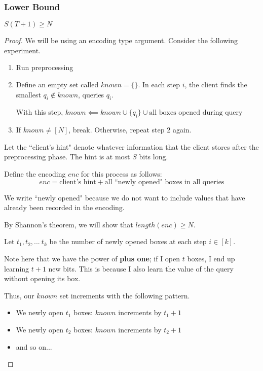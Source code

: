 \subsubsection{Lower Bound} \label{box_lower}
\begin{theorem}
    $S(T+1) \ge N$ 
\end{theorem}
\begin{proof}
    We will be using an encoding type argument. Consider the following experiment.
    \begin{enumerate}
        \item Run preprocessing
        \item Define an empty set called $known = \{\}$. In each step $i$, the client finds the smallest $q_i \notin known$, queries $q_i$.

        With this step, $known \impliedby known \cup \{q_i\} \cup {\text{all boxes opened during query}}$
        \item If $known \neq [N]$, break. Otherwise, repeat step 2 again.
    \end{enumerate}

    Let the ``client's hint" denote whatever information that the client stores after the preprocessing phase. The hint is at most $S$ bits long.
    
    Define the encoding $enc$ for this process as follows: 
    \[enc = \text{client's hint} + \text{all ``newly opened" boxes in all queries}\]

    We write ``newly opened" because we do not want to include values that have already been recorded in the encoding.
    \vspace{5mm}
    
    By Shannon's theorem, we will show that $length(enc) \ge N$.

    Let $t_1, t_2, ...\ t_k$ be the number of newly opened boxes at each step $i \in [k]$. 
    
    Note here that we have the power of \textbf{plus one}; if I open $t$ boxes, I end up learning $t+1$ new bits. This is because I also learn the value of the query without opening its box.

    Thus, our $known$ set increments with the following pattern.

    \begin{itemize}
        \item We newly open $t_1$ boxes: $known$ increments by $t_1 + 1$
        \item We newly open $t_2$ boxes: $known$ increments by $t_2 + 1$
        \item and so on...
    \end{itemize}


\end{proof}
